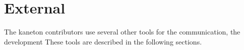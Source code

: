 

%
%

\section{External}

The kaneton contributors use several other tools for the communication, the
development \etc{} These tools are described in the following sections.












